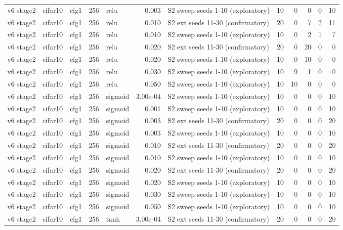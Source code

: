 \begin{table}[htbp]
{\begin{tabular}{@{}lllrlrlrrrrr@{}}
v6 stage2 & cifar10 & cfg1 & 256 & relu & 0.003 & S2 sweep seeds 1-10 (exploratory) & 10 & 0 & 0 & 0 & 10 \\
v6 stage2 & cifar10 & cfg1 & 256 & relu & 0.010 & S2 ext seeds 11-30 (confirmatory) & 20 & 0 & 7 & 2 & 11 \\
v6 stage2 & cifar10 & cfg1 & 256 & relu & 0.010 & S2 sweep seeds 1-10 (exploratory) & 10 & 0 & 2 & 1 & 7 \\
v6 stage2 & cifar10 & cfg1 & 256 & relu & 0.020 & S2 ext seeds 11-30 (confirmatory) & 20 & 0 & 20 & 0 & 0 \\
v6 stage2 & cifar10 & cfg1 & 256 & relu & 0.020 & S2 sweep seeds 1-10 (exploratory) & 10 & 0 & 10 & 0 & 0 \\
v6 stage2 & cifar10 & cfg1 & 256 & relu & 0.030 & S2 sweep seeds 1-10 (exploratory) & 10 & 9 & 1 & 0 & 0 \\
v6 stage2 & cifar10 & cfg1 & 256 & relu & 0.050 & S2 sweep seeds 1-10 (exploratory) & 10 & 10 & 0 & 0 & 0 \\
v6 stage2 & cifar10 & cfg1 & 256 & sigmoid & 3.00e-04 & S2 sweep seeds 1-10 (exploratory) & 10 & 0 & 0 & 0 & 10 \\
v6 stage2 & cifar10 & cfg1 & 256 & sigmoid & 0.001 & S2 sweep seeds 1-10 (exploratory) & 10 & 0 & 0 & 0 & 10 \\
v6 stage2 & cifar10 & cfg1 & 256 & sigmoid & 0.003 & S2 ext seeds 11-30 (confirmatory) & 20 & 0 & 0 & 0 & 20 \\
v6 stage2 & cifar10 & cfg1 & 256 & sigmoid & 0.003 & S2 sweep seeds 1-10 (exploratory) & 10 & 0 & 0 & 0 & 10 \\
v6 stage2 & cifar10 & cfg1 & 256 & sigmoid & 0.010 & S2 ext seeds 11-30 (confirmatory) & 20 & 0 & 0 & 0 & 20 \\
v6 stage2 & cifar10 & cfg1 & 256 & sigmoid & 0.010 & S2 sweep seeds 1-10 (exploratory) & 10 & 0 & 0 & 0 & 10 \\
v6 stage2 & cifar10 & cfg1 & 256 & sigmoid & 0.020 & S2 ext seeds 11-30 (confirmatory) & 20 & 0 & 0 & 0 & 20 \\
v6 stage2 & cifar10 & cfg1 & 256 & sigmoid & 0.020 & S2 sweep seeds 1-10 (exploratory) & 10 & 0 & 0 & 0 & 10 \\
v6 stage2 & cifar10 & cfg1 & 256 & sigmoid & 0.030 & S2 sweep seeds 1-10 (exploratory) & 10 & 0 & 0 & 0 & 10 \\
v6 stage2 & cifar10 & cfg1 & 256 & sigmoid & 0.050 & S2 sweep seeds 1-10 (exploratory) & 10 & 0 & 0 & 0 & 10 \\
v6 stage2 & cifar10 & cfg1 & 256 & tanh & 3.00e-04 & S2 ext seeds 11-30 (confirmatory) & 20 & 0 & 0 & 0 & 20 \\

\end{tabular}}
\end{table}
